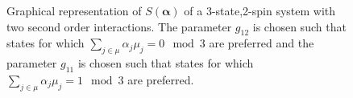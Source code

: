 \begin{figure}[h!]
\begin{subfigure}[b]{0.105\textwidth}
{}
    \end{subfigure}%
    \caption{Graphical representation of $S({\boldsymbol{\alpha}})$ of a 3-state,2-spin system with two second order interactions. 
    The parameter $g_{12}$ is chosen such that states for which  $\sum_{j \in \mu} \alpha_j \mu_j =  0\mod3$ are preferred and the parameter $g_{11}$ is chosen such that states for which  $\sum_{j \in \mu} \alpha_j \mu_j =  1\mod3$ are preferred.}
    \label{fig:s_case_3}
\end{figure}

